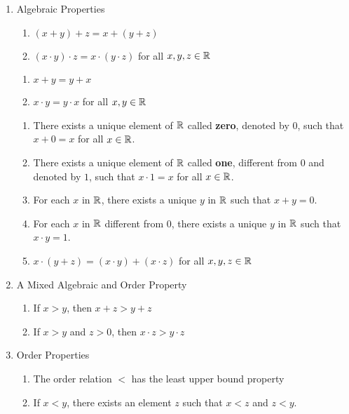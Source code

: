 \begin{enumerate}[itemsep=0pt]
    \item Algebraic Properties
    \begin{enumerate}[itemsep=0pt]
        \item $(x + y) + z = x + (y + z)$
        \item $(x \cdot y) \cdot z = x \cdot (y \cdot z)$ for all $x, y, z \in \mathbb{R}$
    \end{enumerate}
    \begin{enumerate}[itemsep=0pt]
        \item $x + y = y + x$
        \item $x \cdot y = y \cdot x$ for all $x, y \in \mathbb{R}$
    \end{enumerate}
    \begin{enumerate}[itemsep=0pt]
        \item There exists a unique element of $\mathbb{R}$ called \textbf{zero}, denoted by $0$, such that $x + 0 = x$ for all $x \in \mathbb{R}$.
        \item There exists a unique element of $\mathbb{R}$ called \textbf{one}, different from $0$ and denoted by $1$, such that $x \cdot 1 = x$ for all $x \in \mathbb{R}$.
        \item For each $x$ in $\mathbb{R}$, there exists a unique $y$ in $\mathbb{R}$ such that $x + y = 0$.
        \item For each $x$ in $\mathbb{R}$ different from $0$, there exists a unique $y$ in $\mathbb{R}$ such that $x \cdot y = 1$.
        \item $x \cdot (y + z) = (x \cdot y) + (x \cdot z)$ for all $x, y, z\in \mathbb{R}$
    \end{enumerate}
    \item A Mixed Algebraic and Order Property
    \begin{enumerate}[itemsep=0pt]
        \item If $x > y$, then $x + z > y + z$
        \item If $x > y$ and $z > 0$, then $x \cdot z > y \cdot z$
    \end{enumerate}
    \item Order Properties 
    \begin{enumerate}[itemsep=0pt]
        \item The order relation $<$ has the least upper bound property
        \item If $x < y$, there exists an element $z$ such that $x < z$ and $z < y$.
    \end{enumerate}
\end{enumerate}

